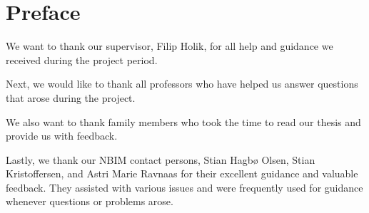 \chapter*{Preface}

We want to thank our supervisor, Filip Holik, for all help and guidance we received during the project period. 

Next, we would like to thank all professors who have helped us answer questions that arose during the project. 

We also want to thank family members who took the time to read our thesis and provide us with feedback.

Lastly, we thank our NBIM contact persons, Stian Hagbø Olsen, Stian Kristoffersen, and Astri Marie Ravnaas for their excellent guidance and valuable feedback. They assisted with various issues and were frequently used for guidance whenever questions or problems arose.

\newpage